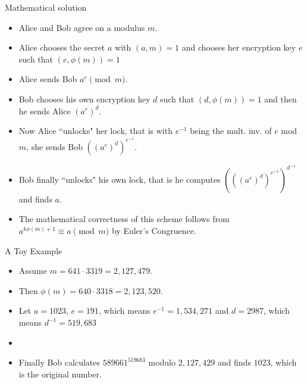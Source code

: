 \documentclass[ %
 usenames,dvipsnames,
aspectratio=169,11pt ]{beamer}
\newenvironment{stepitemize}{\begin{itemize}[<+->]}{\end{itemize} }
\begin{document}
\begin{frame}{Mathematical solution}
\begin{stepitemize}
\item Alice and Bob agree on a modulus $m$.
\item Alice chooses the secret $a$ with $(a,m)=1$ and chooses her encryption key $e$ such that $(e, \phi(m))=1$
\item Alice sends Bob $a^e \pmod{m}$.
\item Bob chooses his own encryption key $d$ such that $(d, \phi(m))=1$ and then he sends Alice $(a^e)^d$.
\item Now Alice ``unlocks" her lock, that is with $e^{-1}$ being the mult. inv. of $e$ mod $m$, she sends Bob $((a^e)^d)^{e^{-1}}$.
\item Bob finally ``unlocks" his own lock, that is he computes
$(((a^e)^d)^{e^{-1}})^{d^{-1}}$ and finds $a$.
\item The mathematical correctness of this scheme follows from
$a^{k\phi(m)+1} \equiv a \pmod{m}$ by Euler's Congruence.
\end{stepitemize}
\end{frame}

\begin{frame}{A Toy Example}
\begin{stepitemize}
\item Assume $m= 641\cdot 3319=2,127,479.$
\item Then $\phi(m)=640\cdot 3318=2,123,520.$
\item Let $a=1023$, $e=191$, which means $e^{-1} = 1,534,271$ and $d=2987$, which means $d^{-1} = 519,683$
\item[]
\begin{center}
\end{center}
\item Finally Bob calculates $589661^{519683}$ modulo $2,127,429$ and finds $1023$, which is the original number.
\end{stepitemize}
\end{frame}
\end{document}
